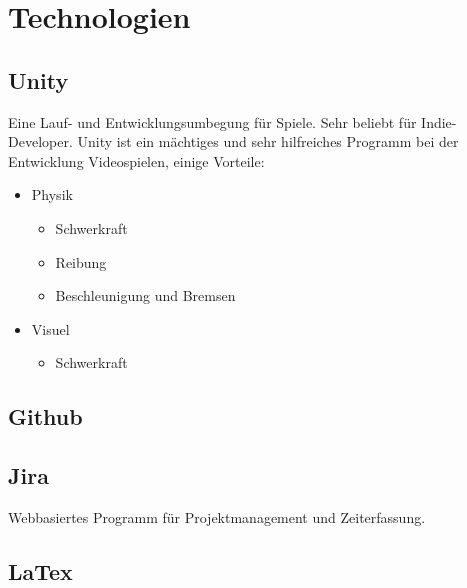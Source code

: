 \chapter{Technologien}

\section{Unity}
Eine Lauf- und Entwicklungsumbegung für Spiele.
Sehr beliebt für Indie-Developer.
Unity ist ein mächtiges und sehr hilfreiches Programm bei der Entwicklung Videospielen, einige Vorteile:
\begin{itemize}
    \item Physik
    \begin{itemize}
        \item Schwerkraft
        \item Reibung
        \item Beschleunigung und Bremsen
    \end{itemize}
    \item Visuel
    \begin{itemize}
        \item Schwerkraft
    \end{itemize}
\end{itemize}

\section{Github}

\section{Jira}
Webbasiertes Programm für Projektmanagement und Zeiterfassung.

\section{LaTex}

